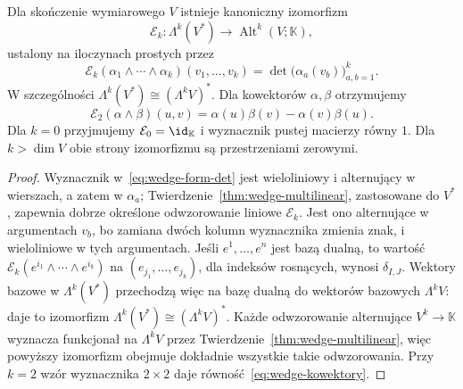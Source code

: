 \begin{twierdzenie}
\label{thm:dual-zewnetrzny}
Dla skończenie wymiarowego $V$ istnieje kanoniczny izomorfizm
\[
 \mathcal E_k\colon\Lambda^k(V^*)
 \longrightarrow\operatorname{Alt}^k(V;\mathbb K),
\]
ustalony na iloczynach prostych przez
\begin{equation}\label{eq:wedge-form-det}
 \mathcal E_k(\alpha_1\wedge\cdots\wedge\alpha_k)
 (v_1,\ldots,v_k)
 =\det\bigl(\alpha_a(v_b)\bigr)_{a,b=1}^k.
\end{equation}
W szczególności $\Lambda^k(V^*)\cong(\Lambda^k V)^*$.
Dla kowektorów $\alpha,\beta$ otrzymujemy
\begin{equation}\label{eq:wedge-kowektory}
 \mathcal E_2(\alpha\wedge\beta)(u,v)
 =\alpha(u)\beta(v)-\alpha(v)\beta(u).
\end{equation}
Dla $k=0$ przyjmujemy $\mathcal E_0=\id_{\mathbb K}$ i wyznacznik
pustej macierzy równy $1$. Dla $k>\dim V$ obie strony izomorfizmu
są przestrzeniami zerowymi.
\end{twierdzenie}
\begin{proof}
Wyznacznik w~\eqref{eq:wedge-form-det} jest wieloliniowy
i alternujący w wierszach, a zatem w $\alpha_a$;
Twierdzenie~\ref{thm:wedge-multilinear}, zastosowane do $V^*$,
zapewnia dobrze określone odwzorowanie liniowe $\mathcal E_k$.
Jest ono alternujące w argumentach $v_b$, bo zamiana dwóch
kolumn wyznacznika zmienia znak, i wieloliniowe w tych
argumentach. Jeśli $e^1,\ldots,e^n$ jest bazą dualną,
to wartość $\mathcal E_k(e^{i_1}\wedge\cdots\wedge e^{i_k})$
na $(e_{j_1},\ldots,e_{j_k})$, dla indeksów rosnących,
wynosi $\delta_{I,J}$. Wektory bazowe w
$\Lambda^k(V^*)$ przechodzą więc na bazę dualną do
wektorów bazowych $\Lambda^k V$: daje to izomorfizm
$\Lambda^k(V^*)\cong(\Lambda^k V)^*$.
Każde odwzorowanie alternujące $V^k\to\mathbb K$ wyznacza
funkcjonał na $\Lambda^k V$ przez
Twierdzenie~\ref{thm:wedge-multilinear}, więc powyższy
izomorfizm obejmuje dokładnie wszystkie takie odwzorowania.
Przy $k=2$ wzór wyznacznika $2\times2$ daje
równość~\eqref{eq:wedge-kowektory}.
\end{proof}

